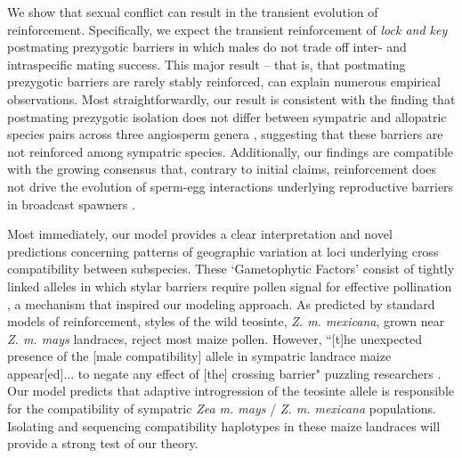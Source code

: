 \documentclass[11pt]{article}
\begin{document}
We show that sexual conflict can result in the transient evolution of reinforcement.  
Specifically, we expect the transient reinforcement of \textit{lock and key} postmating prezygotic barriers in which males do not trade off inter- and intraspecific mating success.  
This major result -- that is, that postmating prezygotic barriers are rarely stably reinforced,  can explain numerous empirical  observations.  
Most straightforwardly, our result is consistent with the finding that postmating prezygotic isolation does not differ between sympatric and allopatric species pairs across three angiosperm genera \citep{moyle2004}, suggesting that these barriers are not reinforced among sympatric species.
Additionally, our findings are compatible with the growing consensus that, contrary to initial claims, reinforcement does not drive the evolution of sperm-egg interactions underlying reproductive barriers in broadcast spawners \citep[see discussion in ][]{vacquier2011}. 

Most immediately, our model provides a clear interpretation and novel predictions concerning patterns of geographic variation at loci underlying cross compatibility between  subspecies. 
These `Gametophytic Factors' consist of tightly linked alleles in which stylar barriers require pollen signal for effective pollination \citep{Things}, a mechanism  that inspired our modeling approach.   %
As predicted by standard models of reinforcement, styles of  the wild teosinte, \textit{Z. m. mexicana}, grown near \textit{Z. m. mays} landraces, reject most maize pollen. 
However, ``[t]he  unexpected  presence  of  the [male compatibility] allele in sympatric landrace maize appear[ed]... to negate  any  effect  of  [the] crossing  barrier" puzzling researchers \citep{kermicle2006}.   %
Our model predicts that adaptive introgression of the teosinte allele is responsible for the compatibility of sympatric \textit{Zea m. mays} / \textit{Z. m. mexicana} populations.  
Isolating and sequencing compatibility haplotypes in these maize landraces will provide a strong test of our theory. 
\end{document}
